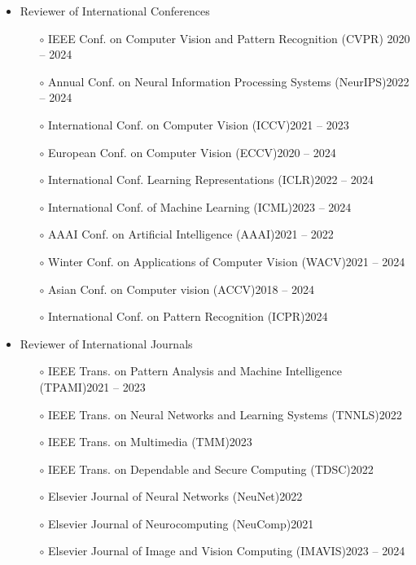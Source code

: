\documentclass[10pt,margin,line,pifont,palatino,courier]{res}
\begin{document}
\begin{resume}
\begin{itemize}[leftmargin=*]
\item Reviewer of International Conferences
	\begin{itemize}[noitemsep, leftmargin=*]
		\item[$\circ$] IEEE Conf. on Computer Vision and Pattern Recognition (CVPR) \hfill 2020 -- 2024
		\item[$\circ$] Annual Conf. on Neural Information Processing Systems (NeurIPS)\hfill 2022 -- 2024
		\item[$\circ$] International Conf. on Computer Vision (ICCV)\hfill 2021 -- 2023
		\item[$\circ$] European Conf. on Computer Vision (ECCV)\hfill 2020 -- 2024
		\item[$\circ$] International Conf. Learning Representations (ICLR)\hfill 2022 -- 2024
		\item[$\circ$] International Conf. of Machine Learning (ICML)\hfill 2023 -- 2024
		\item[$\circ$] AAAI Conf. on Artificial Intelligence (AAAI)\hfill 2021 -- 2022
		\item[$\circ$] Winter Conf. on Applications of Computer Vision (WACV)\hfill 2021 -- 2024
		\item[$\circ$] Asian Conf. on Computer vision (ACCV)\hfill 2018 -- 2024
        \item[$\circ$] International Conf. on Pattern Recognition (ICPR)\hfill 2024
	\end{itemize}
\item Reviewer of International Journals
	\begin{itemize}[noitemsep, leftmargin=*]
		\item[$\circ$] IEEE Trans. on Pattern Analysis and Machine Intelligence (TPAMI)\hfill 2021 -- 2023
        \item[$\circ$] IEEE Trans. on Neural Networks and Learning Systems (TNNLS)\hfill 2022
        \item[$\circ$] IEEE Trans. on Multimedia (TMM)\hfill 2023
        \item[$\circ$] IEEE Trans. on Dependable and Secure Computing (TDSC)\hfill 2022
        \item[$\circ$] Elsevier Journal of Neural Networks (NeuNet)\hfill 2022
        \item[$\circ$] Elsevier Journal of Neurocomputing (NeuComp)\hfill 2021
        \item[$\circ$] Elsevier Journal of Image and Vision Computing (IMAVIS)\hfill 2023 -- 2024

\end{itemize}
\end{itemize}
\end{resume}
\end{document}
